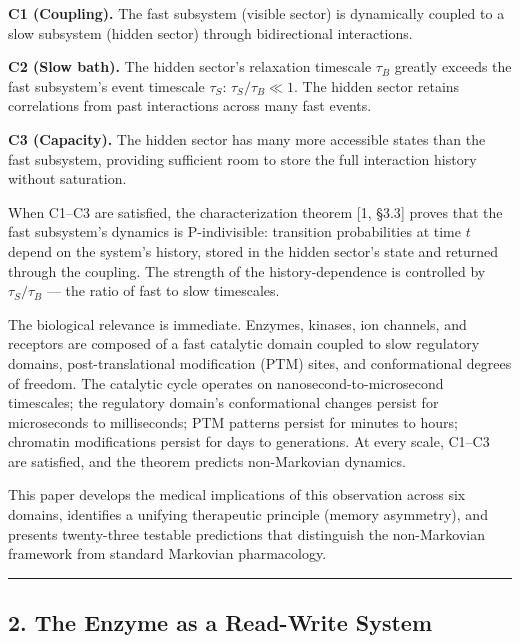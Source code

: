 \documentclass[
  11pt,
]{article}
\begin{document}
\textbf{C1 (Coupling).} The fast subsystem (visible sector) is
dynamically coupled to a slow subsystem (hidden sector) through
bidirectional interactions.

\textbf{C2 (Slow bath).} The hidden sector's relaxation timescale
\(\tau_B\) greatly exceeds the fast subsystem's event timescale
\(\tau_S\): \(\tau_S / \tau_B \ll 1\). The hidden sector retains
correlations from past interactions across many fast events.

\textbf{C3 (Capacity).} The hidden sector has many more accessible
states than the fast subsystem, providing sufficient room to store the
full interaction history without saturation.

When C1--C3 are satisfied, the characterization theorem {[}1, §3.3{]}
proves that the fast subsystem's dynamics is P-indivisible: transition
probabilities at time \(t\) depend on the system's history, stored in
the hidden sector's state and returned through the coupling. The
strength of the history-dependence is controlled by \(\tau_S / \tau_B\)
--- the ratio of fast to slow timescales.

The biological relevance is immediate. Enzymes, kinases, ion channels,
and receptors are composed of a fast catalytic domain coupled to slow
regulatory domains, post-translational modification (PTM) sites, and
conformational degrees of freedom. The catalytic cycle operates on
nanosecond-to-microsecond timescales; the regulatory domain's
conformational changes persist for microseconds to milliseconds; PTM
patterns persist for minutes to hours; chromatin modifications persist
for days to generations. At every scale, C1--C3 are satisfied, and the
theorem predicts non-Markovian dynamics.

This paper develops the medical implications of this observation across
six domains, identifies a unifying therapeutic principle (memory
asymmetry), and presents twenty-three testable predictions that
distinguish the non-Markovian framework from standard Markovian
pharmacology.

\begin{center}\rule{0.5\linewidth}{0.5pt}\end{center}

\hypertarget{the-enzyme-as-a-read-write-system}{%
\subsection{2. The Enzyme as a Read-Write
System}\label{the-enzyme-as-a-read-write-system}}
\end{document}
